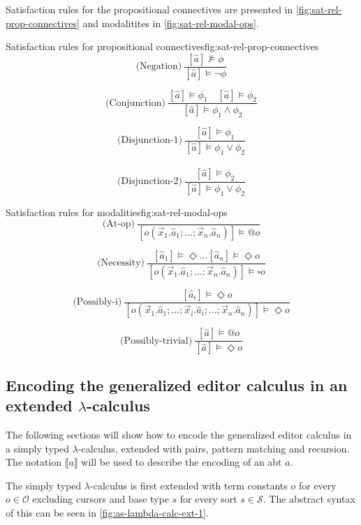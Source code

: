 Satisfaction rules for the propositional connectives are presented in \cref{fig:sat-rel-prop-connectives} and modalitites in \cref{fig:sat-rel-modal-ops}.

\begin{myfigure}{Satisfaction rules for propositional connectives}{fig:sat-rel-prop-connectives}
    \[
        \text{(Negation)} \ \frac{[\hat{a}] \not\models \phi}{[\hat{a}] \models \neg \phi}
    \]

    \[
        \text{(Conjunction)} \ \frac{[\hat{a}] \models \phi_1 \quad [\hat{a}] \models \phi_2}{[\hat{a}] \models \phi_1 \land \phi_2}
    \]

    \[
        \text{(Disjunction-1)} \ \frac{[\hat{a}] \models \phi_1}{[\hat{a}] \models \phi_1 \lor \phi_2}
    \]
    \\
    \[
        \text{(Disjunction-2)} \ \frac{[\hat{a}] \models \phi_2}{[\hat{a}] \models \phi_1 \lor \phi_2}
    \]
\end{myfigure}

\begin{myfigure}{Satisfaction rules for modalities}{fig:sat-rel-modal-ops}
    \[
        \text{(At-op)} \ \frac{}{[o(\vec{x}_1.\hat{a}_1;...;\vec{x}_n.\hat{a}_n)] \models @o}
    \]

    \[
        \text{(Necessity)} \ \frac{[\hat{a}_1] \models \Diamond ... [\hat{a}_n] \models \Diamond o}{[o(\vec{x}_1.\hat{a}_1;...;\vec{x}_n.\hat{a}_n)] \models \square o}
    \]

    \[
        \text{(Possibly-i)} \ \frac{[\hat{a}_i] \models \Diamond o}{[o(\vec{x}_1.\hat{a}_1;...;\Vec{x}_i.\hat{a}_i;...;\vec{x}_n.\hat{a}_n)] \models \Diamond o}
    \]

    \[
        \text{(Possibly-trivial)} \ \frac{[\hat{a}] \models @o}{[\hat{a}] \models \Diamond o}
    \]
\end{myfigure}

\subsection{Encoding the generalized editor calculus in an extended $\lambda$-calculus}
The following sections will show how to encode the generalized editor calculus in a simply typed $\lambda$-calculus, extended with pairs, pattern matching and recursion. The notation $\llbracket a \rrbracket$ will be used to describe the encoding of an abt $a$.

The simply typed $\lambda$-calculus is first extended with term constants $o$ for every $o \in \mathcal{O}$ excluding cursors and base type $s$ for every sort $s \in \mathcal{S}$. The abstract syntax of this can be seen in \cref{fig:as-lambda-calc-ext-1}.

